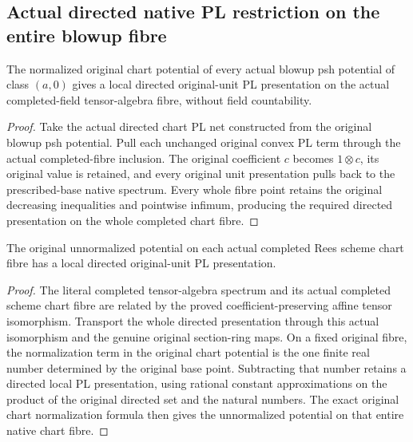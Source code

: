 \subsection{Actual directed native PL restriction on the entire blowup fibre}

\begin{lemma}
\label{lem:fc-completed-chart-directed-pl}
\leanok
{}
The normalized original chart potential of every actual blowup psh potential
of class $(a,0)$ gives a local directed original-unit PL presentation on the
actual completed-field tensor-algebra fibre, without field countability.
\end{lemma}
\begin{proof}
Take the actual directed chart PL net constructed from the original blowup
psh potential. Pull each unchanged original convex PL term through the actual
completed-fibre inclusion. The original coefficient $c$ becomes $1\otimes c$,
its original value is retained, and every original unit presentation pulls
back to the prescribed-base native spectrum. Every whole fibre point retains
the original decreasing inequalities and pointwise infimum, producing the
required directed presentation on the whole completed chart fibre.
\end{proof}

\begin{lemma}
\label{lem:fc-native-chart-directed-pl}
\leanok
{}
The original unnormalized potential on each actual completed Rees scheme
chart fibre has a local directed original-unit PL presentation.
\end{lemma}
\begin{proof}
The literal completed tensor-algebra spectrum and its actual completed scheme
chart fibre are related by the proved coefficient-preserving affine tensor
isomorphism. Transport the whole directed presentation through this actual
isomorphism and the genuine original section-ring maps. On a fixed original
fibre, the normalization term in the original chart potential is the one
finite real number determined by the original base point. Subtracting that
number retains a directed local PL presentation, using rational constant
approximations on the product of the original directed set and the natural
numbers. The exact original chart normalization formula then gives the
unnormalized potential on that entire native chart fibre.
\end{proof}

